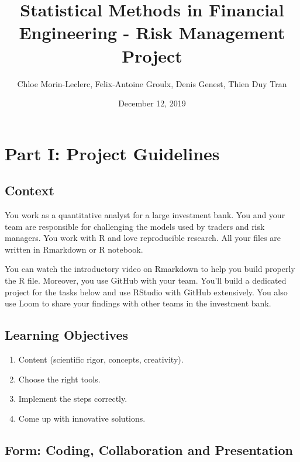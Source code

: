 \documentclass[]{article}
\title{Statistical Methods in Financial Engineering - Risk Management Project}
\author{Chloe Morin-Leclerc, Felix-Antoine Groulx, Denis Genest, Thien Duy Tran}
\date{December 12, 2019}
\providecommand{\tightlist}{%
  \setlength{\itemsep}{0pt}\setlength{\parskip}{0pt}}
\begin{document}
\maketitle

\hypertarget{part-i-project-guidelines}{%
\section{Part I: Project Guidelines}\label{part-i-project-guidelines}}

\hypertarget{context}{%
\subsection{Context}\label{context}}

You work as a quantitative analyst for a large investment bank. You and
your team are responsible for challenging the models used by traders and
risk managers. You work with R and love reproducible research. All your
files are written in Rmarkdown or R notebook.

You can watch the introductory video on Rmarkdown to help you build
properly the R file. Moreover, you use GitHub with your team. You'll
build a dedicated project for the tasks below and use RStudio with
GitHub extensively. You also use Loom to share your findings with other
teams in the investment bank.

\hypertarget{learning-objectives}{%
\subsection{Learning Objectives}\label{learning-objectives}}

\begin{enumerate}
\def\labelenumi{\arabic{enumi}.}
\tightlist
\item
  Content (scientific rigor, concepts, creativity).\\
\item
  Choose the right tools.\\
\item
  Implement the steps correctly.\\
\item
  Come up with innovative solutions.\\
\end{enumerate}

\hypertarget{form-coding-collaboration-and-presentation}{%
\subsection{Form: Coding, Collaboration and
Presentation}\label{form-coding-collaboration-and-presentation}}
\end{document}
